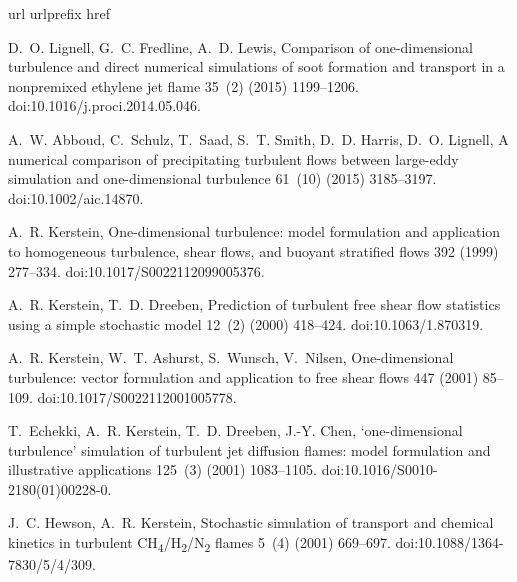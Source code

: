 \documentclass[preprint,12pt, a4paper]{elsarticle}
\begin{document}
\begin{thebibliography}{10}
\expandafter\ifx\csname url\endcsname\relax
  \def\url#1{\texttt{#1}}\fi
\expandafter\ifx\csname urlprefix\endcsname\relax\def\urlprefix{URL }\fi
\expandafter\ifx\csname href\endcsname\relax
  \def\href#1#2{#2} \def\path#1{#1}\fi

D.~O. Lignell, G.~C. Fredline, A.~D. Lewis, Comparison of one-dimensional
  turbulence and direct numerical simulations of soot formation and transport
  in a nonpremixed ethylene jet flame 35~(2) (2015) 1199--1206.
\newblock \href {http://dx.doi.org/10.1016/j.proci.2014.05.046}
  {\path{doi:10.1016/j.proci.2014.05.046}}.

A.~W. Abboud, C.~Schulz, T.~Saad, S.~T. Smith, D.~D. Harris, D.~O. Lignell, A
  numerical comparison of precipitating turbulent flows between large-eddy
  simulation and one-dimensional turbulence 61~(10) (2015) 3185--3197.
\newblock \href {http://dx.doi.org/10.1002/aic.14870}
  {\path{doi:10.1002/aic.14870}}.

A.~R. Kerstein, One-dimensional turbulence: model formulation and application
  to homogeneous turbulence, shear flows, and buoyant stratified flows 392
  (1999) 277--334.
\newblock \href {http://dx.doi.org/10.1017/S0022112099005376}
  {\path{doi:10.1017/S0022112099005376}}.

A.~R. Kerstein, T.~D. Dreeben, Prediction of turbulent free shear flow
  statistics using a simple stochastic model 12~(2) (2000) 418--424.
\newblock \href {http://dx.doi.org/10.1063/1.870319}
  {\path{doi:10.1063/1.870319}}.

A.~R. Kerstein, W.~T. Ashurst, S.~Wunsch, V.~Nilsen, One-dimensional
  turbulence: vector formulation and application to free shear flows 447 (2001)
  85--109.
\newblock \href {http://dx.doi.org/10.1017/S0022112001005778}
  {\path{doi:10.1017/S0022112001005778}}.

T.~Echekki, A.~R. Kerstein, T.~D. Dreeben, J.-Y. Chen, `one-dimensional
  turbulence' simulation of turbulent jet diffusion flames: model formulation
  and illustrative applications 125~(3) (2001) 1083--1105.
\newblock \href {http://dx.doi.org/10.1016/S0010-2180(01)00228-0}
  {\path{doi:10.1016/S0010-2180(01)00228-0}}.

J.~C. Hewson, A.~R. Kerstein, Stochastic simulation of transport and chemical
  kinetics in turbulent
  {CH}\textsubscript{4}/{H}\textsubscript{2}/{N}\textsubscript{2 }flames 5~(4)
  (2001) 669--697.
\newblock \href {http://dx.doi.org/10.1088/1364-7830/5/4/309}
  {\path{doi:10.1088/1364-7830/5/4/309}}.


\end{thebibliography}
\end{document}
